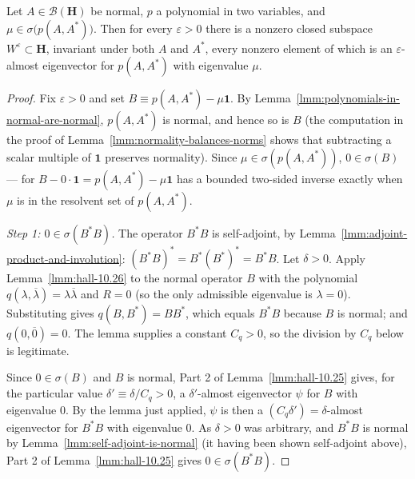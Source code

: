 \begin{lemma}
    \label{lmm:hall-10.27}
    \leanok
    Let $A \in \mathcal{B}(\mathbf{H})$ be normal, $p$ a polynomial in two variables, and $\mu \in \sigma\big( p(A,A^*) \big)$. Then for every $\varepsilon > 0$ there is a nonzero closed subspace $W^\varepsilon \subset \mathbf{H}$, invariant under both $A$ and $A^*$, every nonzero element of which is an $\varepsilon$-almost eigenvector for $p(A,A^*)$ with eigenvalue $\mu$.
\end{lemma}
\begin{proof}
    \leanok
Fix $\varepsilon > 0$ and set $B \equiv p(A,A^*) - \mu\mathbf{1}$. By Lemma~\ref{lmm:polynomials-in-normal-are-normal}, $p(A,A^*)$ is normal, and hence so is $B$ (the computation in the proof of Lemma~\ref{lmm:normality-balances-norms} shows that subtracting a scalar multiple of $\mathbf{1}$ preserves normality). Since $\mu \in \sigma(p(A,A^*))$, $0 \in \sigma(B)$ — for $B - 0\cdot\mathbf{1} = p(A,A^*) - \mu\mathbf{1}$ has a bounded two-sided inverse exactly when $\mu$ is in the resolvent set of $p(A,A^*)$.

\textit{Step 1: $0 \in \sigma(B^*B)$.} The operator $B^*B$ is self-adjoint, by Lemma~\ref{lmm:adjoint-product-and-involution}: $(B^*B)^* = B^*(B^*)^* = B^*B$. Let $\delta > 0$. Apply Lemma~\ref{lmm:hall-10.26} to the normal operator $B$ with the polynomial $q(\lambda,\overline\lambda) = \lambda\overline\lambda$ and $R = 0$ (so the only admissible eigenvalue is $\lambda = 0$). Substituting gives $q(B,B^*) = BB^*$, which equals $B^*B$ because $B$ is normal; and $q(0,\overline{0}) = 0$. The lemma supplies a constant $C_q > 0$, so the division by $C_q$ below is legitimate.

Since $0 \in \sigma(B)$ and $B$ is normal, Part 2 of Lemma~\ref{lmm:hall-10.25} gives, for the particular value $\delta' \equiv \delta/C_q > 0$, a $\delta'$-almost eigenvector $\psi$ for $B$ with eigenvalue $0$. By the lemma just applied, $\psi$ is then a $(C_q\delta') = \delta$-almost eigenvector for $B^*B$ with eigenvalue $0$. As $\delta>0$ was arbitrary, and $B^*B$ is normal by Lemma~\ref{lmm:self-adjoint-is-normal} (it having been shown self-adjoint above), Part 2 of Lemma~\ref{lmm:hall-10.25} gives $0 \in \sigma(B^*B)$.


\end{proof}
